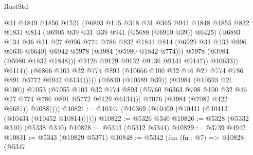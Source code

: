 \begin{lexlean}{RustStd}
\begin{coremodule}
                                @31
                                @1849
                                @1856
                                @1521
                                (@6893
                                  @115
                                  @318
                                  @31
                                  @365
                                  @941
                                  @1848
                                  @1855
                                  @832
                                  @1831
                                  @814
                                  (@6905 @39 @31 @39 @941 (@5688 (@6910 @39)) @6425)
                                  (@6893
                                    @134
                                    @46
                                    @31
                                    @27
                                    @996
                                    @774
                                    @786
                                    @832
                                    @1841
                                    @814
                                    (@6929 @31 @133 @996 @6636 @6640)
                                    @6942
                                    @5978
                                    (@3984 (@5980 @1842 @774)))
                                  @5978
                                  (@3984 (@5980 @1832 @1848)))
                                @9126
                                @9129
                                @9132
                                @9136
                                @9141
                                @9147))
                            @10633))
                        @6114))
                    (@6866
                      @103
                      @32
                      @774
                      @893
                      (@10666 @100 @32 @46 @27 @774 @786 @891 @5772 @6942 @6134)))))
              (@6830 (@10589 @39))
              (@3984 (@10593 @21 @100))
              @7053
              (@7055
                @103
                @32
                @774
                @893
                (@5760 @6363 @708 @100 @32 @46 @27 @774 @786 @891 @5772 @6429 @6134)))
            @7076
            (@3984 (@7082 @422 @6687))
            @7088))))
@10821 := @10347 (@10369 (@10409 (@10411 (@10413 (@10434 (@10452 @10814))))))
@10822 := @5326 @340
@10826 := @5328 (@5332 @340) (@5338 @340)
@10828 := @5343 (@5312 @5344)
@10829 := @3739 @4942
@10831 := @5343 (@10829 @5371)
@10848 := @5342
    (fun (fn : @7) =>
    @10828
      (@5347

\end{coremodule}
\end{lexlean}
